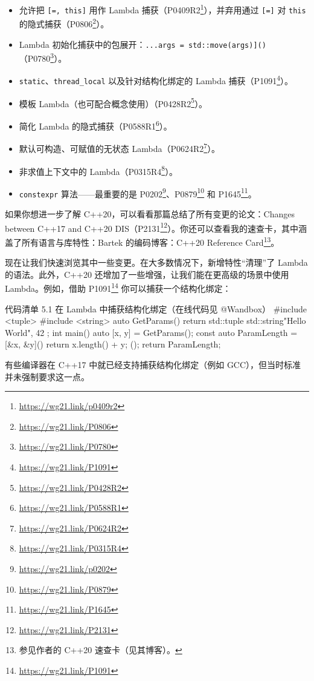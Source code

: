 \begin{itemize}
\item 允许把 \texttt{[=, this]} 用作 Lambda 捕获（P0409R2\footnote{\url{https://wg21.link/p0409r2}}），并弃用通过 \texttt{[=]} 对 \texttt{this} 的隐式捕获（P0806\footnote{\url{https://wg21.link/P0806}}）。
\item Lambda 初始化捕获中的包展开：\texttt{...args = std::move(args)](){}}（P0780\footnote{\url{https://wg21.link/P0780}}）。
\item \texttt{static}、\texttt{thread\_local} 以及针对结构化绑定的 Lambda 捕获（P1091\footnote{\url{https://wg21.link/P1091}}）。
\item 模板 Lambda（也可配合概念使用）（P0428R2\footnote{\url{https://wg21.link/P0428R2}}）。
\item 简化 Lambda 的隐式捕获（P0588R1\footnote{\url{https://wg21.link/P0588R1}}）。
\item 默认可构造、可赋值的无状态 Lambda（P0624R2\footnote{\url{https://wg21.link/P0624R2}}）。
\item 非求值上下文中的 Lambda（P0315R4\footnote{\url{https://wg21.link/P0315R4}}）。
\item \texttt{constexpr} 算法——最重要的是 P0202\footnote{\url{https://wg21.link/p0202}}、P0879\footnote{\url{https://wg21.link/P0879}} 和 P1645\footnote{\url{https://wg21.link/P1645}}。
\end{itemize}

如果你想进一步了解 C++20，可以看看那篇总结了所有变更的论文：Changes between C++17 and C++20 DIS（P2131\footnote{\url{https://wg21.link/P2131}}）。你还可以查看我的速查卡，其中涵盖了所有语言与库特性：Bartek 的编码博客：C++20 Reference Card\footnote{参见作者的 C++20 速查卡（见其博客）。}。

现在让我们快速浏览其中一些变更。在大多数情况下，新增特性“清理”了 Lambda 的语法。此外，C++20 还增加了一些增强，让我们能在更高级的场景中使用 Lambda。例如，借助 P1091\footnote{\url{https://wg21.link/P1091}} 你可以捕获一个结构化绑定：

\begin{codeboxt}{代码清单 5.1 在 Lambda 中捕获结构化绑定（在线代码见 @Wandbox）}
#include <tuple>
#include <string>
auto GetParams() {
return std::tuple { std::string{"Hello World"}, 42 };
}
int main() {
auto [x, y] = GetParams();
const auto ParamLength = [&x, &y]() { return x.length() + y; }();
return ParamLength;
}
\end{codeboxt}


有些编译器在 C++17 中就已经支持捕获结构化绑定（例如 GCC），但当时标准并未强制要求这一点。

